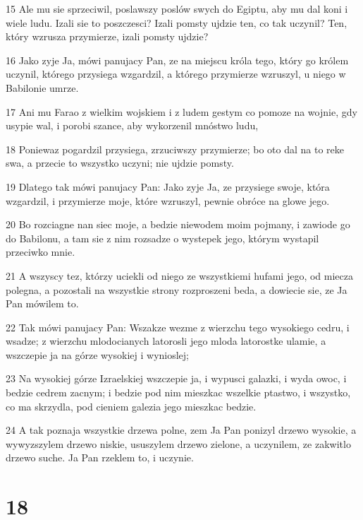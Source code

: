 \par 15 Ale mu sie sprzeciwil, poslawszy poslów swych do Egiptu, aby mu dal koni i wiele ludu. Izali sie to poszczesci? Izali pomsty ujdzie ten, co tak uczynil? Ten, który wzrusza przymierze, izali pomsty ujdzie?
\par 16 Jako zyje Ja, mówi panujacy Pan, ze na miejscu króla tego, który go królem uczynil, którego przysiega wzgardzil, a którego przymierze wzruszyl, u niego w Babilonie umrze.
\par 17 Ani mu Farao z wielkim wojskiem i z ludem gestym co pomoze na wojnie, gdy usypie wal, i porobi szance, aby wykorzenil mnóstwo ludu,
\par 18 Poniewaz pogardzil przysiega, zrzuciwszy przymierze; bo oto dal na to reke swa, a przecie to wszystko uczyni; nie ujdzie pomsty.
\par 19 Dlatego tak mówi panujacy Pan: Jako zyje Ja, ze przysiege swoje, która wzgardzil, i przymierze moje, które wzruszyl, pewnie obróce na glowe jego.
\par 20 Bo rozciagne nan siec moje, a bedzie niewodem moim pojmany, i zawiode go do Babilonu, a tam sie z nim rozsadze o wystepek jego, którym wystapil przeciwko mnie.
\par 21 A wszyscy tez, którzy uciekli od niego ze wszystkiemi hufami jego, od miecza polegna, a pozostali na wszystkie strony rozproszeni beda, a dowiecie sie, ze Ja Pan mówilem to.
\par 22 Tak mówi panujacy Pan: Wszakze wezme z wierzchu tego wysokiego cedru, i wsadze; z wierzchu mlodocianych latorosli jego mloda latorostke ulamie, a wszczepie ja na górze wysokiej i wynioslej;
\par 23 Na wysokiej górze Izraelskiej wszczepie ja, i wypusci galazki, i wyda owoc, i bedzie cedrem zacnym; i bedzie pod nim mieszkac wszelkie ptastwo, i wszystko, co ma skrzydla, pod cieniem galezia jego mieszkac bedzie.
\par 24 A tak poznaja wszystkie drzewa polne, zem Ja Pan ponizyl drzewo wysokie, a wywyzszylem drzewo niskie, ususzylem drzewo zielone, a uczynilem, ze zakwitlo drzewo suche. Ja Pan rzeklem to, i uczynie.

\chapter{18}

